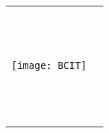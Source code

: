 \begin{titlepage}
\null\vfill
\begin{center}
\large
\sffamily

\bigskip

{\huge\spacedlowsmallcaps{\myTitle} \\
}

\bigskip
    
\vspace{10cm}

\begin{tabular} {cc}
	\parbox{0.4\textwidth}{\texttt{[image: BCIT]}}
	&
	\parbox{0.6\textwidth}{{\Large\spacedlowsmallcaps{\mySubTitle}} \\ 
	
						{\normalsize
						
						\myName \hspace{2.5mm}\spacedlowsmallcaps\myStudentID \\
						\myEmail \\
						\myProgram \\
						\mySpecialization \\
						\myTime}}
\end{tabular}
\end{center}
\vfill
\end{titlepage}



